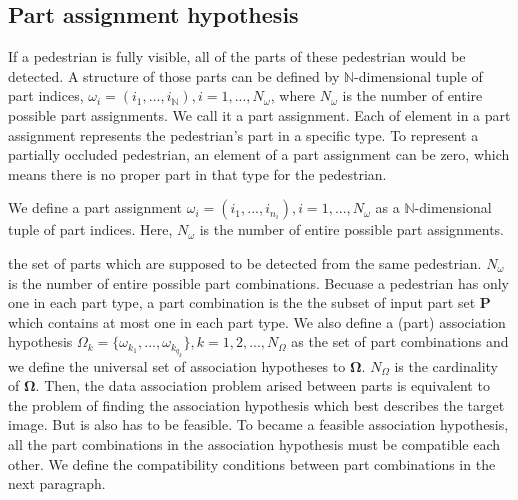 \documentclass[runningheads]{llncs}
\begin{document}
\subsection{Part assignment hypothesis}
\label{subsec:part_assignment_hypothesis}
If a pedestrian is fully visible, all of the parts of these pedestrian would be detected.
A structure of those parts can be defined by $\mathbb{N}$-dimensional tuple of part indices, $\omega_i=(i_1,...,i_{\mathbb{N}}), i=1,...,N_{\omega}$, where $N_{\omega}$ is the number of entire possible part assignments.
We call it a part assignment.
Each of element in a part assignment represents the pedestrian's part in a specific type.
To represent a partially occluded pedestrian, an element of a part assignment can be zero, which means there is no proper part in that type for the pedestrian.




We define a part assignment $\omega_i=(i_1,...,i_{n_i}), i=1,...,N_{\omega}$ as a $\mathbb{N}$-dimensional tuple of part indices.
Here, $N_{\omega}$ is the number of entire possible part assignments.


the set of parts which are supposed to be detected from the same pedestrian. $N_{\omega}$ is the number of entire possible part combinations. Becuase a pedestrian has only one in each part type, a part combination is the the subset of input part set $\mathbf{P}$ which contains at most one in each part type.
We also define a (part) association hypothesis $\Omega_k=\{\omega_{k_1},...,\omega_{k_{q_k}}\}, k=1,2,...,N_{\Omega}$ as the set of part combinations and we define the universal set of association hypotheses to $\mathbf{\Omega}$. $N_{\Omega}$ is the cardinality of $\mathbf{\Omega}$.
Then, the data association problem arised between parts is equivalent to the problem of finding the association hypothesis which best describes the target image.
But is also has to be feasible.
To became a feasible association hypothesis, all the part combinations in the association hypothesis must be compatible each other.
We define the compatibility conditions between part combinations in the next paragraph.
\end{document}

